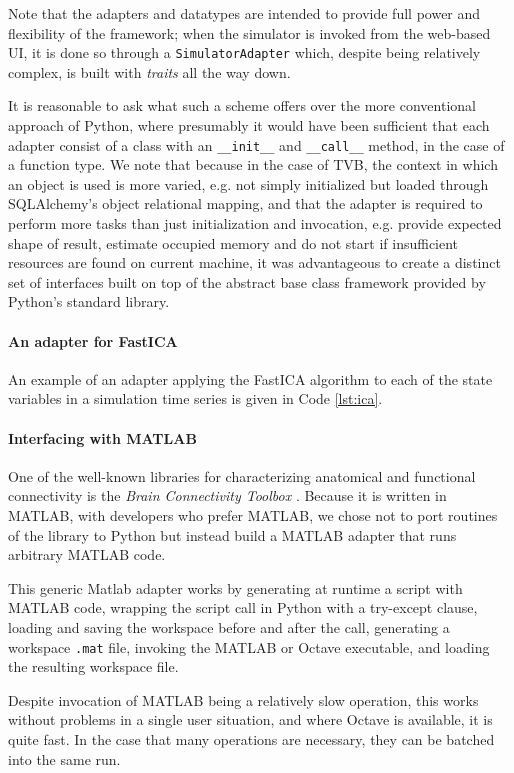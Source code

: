 Note that the adapters and datatypes are intended to provide full 
power and flexibility of the framework; when the simulator is invoked from
the web-based UI, it is done so through a \texttt{SimulatorAdapter} which,
despite being relatively complex, is built with \emph{traits} all the way down.

It is reasonable to ask what such a scheme offers over the more 
conventional approach of Python, where presumably it would have been
sufficient that each adapter consist of a class with an \texttt{\_\_init\_\_}
and \texttt{\_\_call\_\_} method, in the case of a function type. 
We note that because in the case of TVB, the context in which an object
is used is more varied, e.g. not simply initialized but loaded through 
SQLAlchemy's object relational mapping, and that the adapter is required to perform more tasks
than just initialization and invocation, e.g. provide expected shape of 
result, estimate occupied memory and do not start if insufficient resources are found on current machine,
 it was advantageous to create a distinct set of interfaces built on top of
the abstract base class framework provided by Python's standard library.

\paragraph{An adapter for FastICA}

An example of an adapter applying the FastICA algorithm to each of the 
state variables in a simulation time series is given in Code \ref{lst:ica}.



\paragraph{Interfacing with MATLAB}

One of the well-known libraries for characterizing anatomical 
and functional connectivity is the \emph{Brain Connectivity Toolbox} 
\citep{Rubinov_2010}. 
Because it is written in MATLAB, with developers who prefer MATLAB, we 
chose not to port routines of the library to Python but instead build
a MATLAB adapter that runs arbitrary MATLAB code. 

This generic Matlab adapter works by generating at runtime a script with MATLAB code, 
wrapping the script call in Python with a try-except clause,  
loading and saving the workspace before and after the call,
generating a workspace \texttt{.mat} file, invoking the MATLAB or Octave
executable, and loading the resulting workspace file. 

Despite invocation of MATLAB being a relatively slow operation, this works
without problems in a single user situation, and where Octave is available, it
is quite fast. In the case that many operations are necessary, they can be
batched into the same run.

